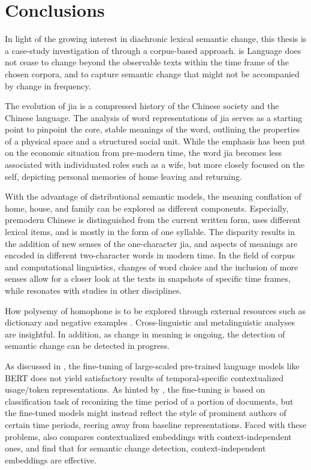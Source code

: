 

\chapter{Conclusions}
\label{conclusions}

In light of the growing interest in diachronic lexical semantic change, this thesis is a case-study investigation of \jia through a corpus-based approach. is Language does not cease to change beyond the observable texts within the time frame of the chosen corpora, and to capture semantic change that might not be accompanied by change in frequency.

The evolution of jia is a compressed history of the Chinese society and the Chinese language. The analysis of word representations of jia serves as a starting point to pinpoint the core, stable meanings of the word, outlining the properties of a physical space and a structured social unit. While the emphasis has been put on the economic situation from pre-modern time, the word jia becomes less associated with individuated roles such as a wife, but more closely focused on the self, depicting personal memories of home leaving and returning. 

With the advantage of distributional semantic models, the meaning conflation of home, house, and family can be explored as different components. Especially, premodern Chinese is distinguished from the current written form, uses different lexical items, and is mostly in the form of one syllable. The disparity results in the addition of new senses of the one-character jia, and aspects of meanings are encoded in different two-character words in modern time. In the field of corpus and computational linguistics, changes of word choice and the inclusion of more senses allow for a closer look at the texts in snapshots of specific time frames, while resonates with studies in other disciplines.

How polysemy of homophone is to be explored through external resources such as dictionary and negative examples \textcite[15]{traugott2001regularity}.  Cross-linguistic and metalinguistic analyses are insightful. In addition, as change in meaning is ongoing, the detection of semantic change can be detected in progress.

As discussed in \textcite{giulianelli2019lexical}, the fine-tuning of large-scaled pre-trained language models like BERT does not yield satisfactory results of temporal-specific contextualized usage/token representations. As hinted by \textcite{giulianelli2019lexical}, the fine-tuning is based on classification task of reconizing the time period of a portion of documents, but the fine-tuned models might instead reflect the style of prominent authors of certain time periods, reering away from baseline representations. Faced with these problems, \textcite{kutuzov2020uio} also compares contextualized embeddings with context-independent ones, and find that for semantic change detection, context-independent embeddings are effective.

